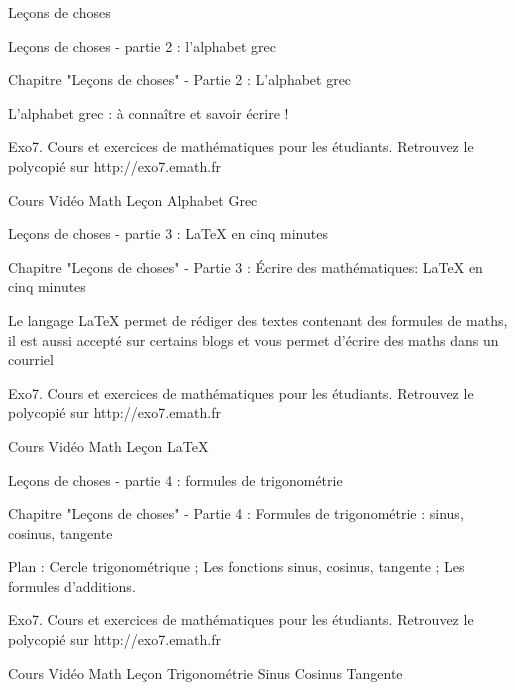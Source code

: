 
   Leçons de choses

Leçons de choses - partie 2 : l'alphabet grec



Chapitre "Leçons de choses" - Partie 2 : L'alphabet grec

L'alphabet grec : à connaître et savoir écrire !

Exo7. Cours et exercices de mathématiques pour les étudiants.
Retrouvez le polycopié sur http://exo7.emath.fr


Cours Vidéo Math Leçon Alphabet Grec




Leçons de choses - partie 3 : LaTeX en cinq minutes



Chapitre "Leçons de choses" - Partie 3 : Écrire des mathématiques: LaTeX en cinq minutes

Le langage LaTeX permet de rédiger des textes contenant des formules de maths,
il est aussi accepté sur certains blogs et vous permet d'écrire des maths
dans un courriel

Exo7. Cours et exercices de mathématiques pour les étudiants.
Retrouvez le polycopié sur http://exo7.emath.fr


Cours Vidéo Math Leçon LaTeX




Leçons de choses - partie 4 : formules de trigonométrie



Chapitre "Leçons de choses" - Partie 4 : Formules de trigonométrie : sinus, cosinus, tangente

Plan : Cercle trigonométrique ; Les fonctions sinus, cosinus, tangente ;
Les formules d'additions.

Exo7. Cours et exercices de mathématiques pour les étudiants.
Retrouvez le polycopié sur http://exo7.emath.fr


Cours Vidéo Math Leçon Trigonométrie Sinus Cosinus Tangente


